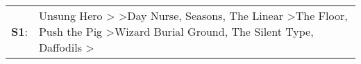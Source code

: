 \begin{supertabular}{p{0.03\textwidth}p{0.92\textwidth}}
 \textbf{S1}:  &  Unsung Hero\textsuperscript{} \textgreater {}\textsuperscript{} \textgreater \enspace Day Nurse\textsuperscript{}, \enspace Seasons\textsuperscript{}, \enspace The Linear\textsuperscript{} \textgreater \enspace The Floor\textsuperscript{}, \enspace Push the Pig\textsuperscript{} \textgreater \enspace Wizard Burial Ground\textsuperscript{}, \enspace The Silent Type\textsuperscript{}, \enspace Daffodils\textsuperscript{} \textgreater {}\textsuperscript{}  \enspace  \\
\end{supertabular}
